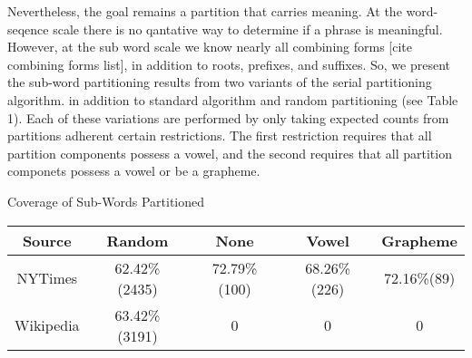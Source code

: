 Nevertheless,
the goal remains a partition that carries meaning.
At the word-seqence scale there is no qantative way to determine if a phrase is meaningful.
However, at the sub word scale we know nearly all combining forms [cite combining forms list],
in addition to roots, prefixes, and suffixes.
So, we present the sub-word partitioning results from two variants of the serial partitioning algorithm.
in addition to standard algorithm and random partitioning (see Table 1).
Each of these variations are performed by only taking expected counts from partitions adherent certain restrictions.
The first restriction requires that all partition components possess a vowel,
and the second requires that all partition componets possess a vowel or be a grapheme.

\begin{center}

{Coverage of Sub-Words Partitioned}\newline


{\fontsize{6.8}{8.16}\selectfont

\begin{tabular}{|c|c|c|c|c|}
\hline Source & Random & None  & Vowel & Grapheme\\\hline
NYTimes& 62.42\% (2435) & 72.79\% (100) &68.26\% (226) & 72.16\%(89) \\\hline
Wikipedia& 63.42\% (3191)& 0 & 0 &0 \\\hline
\end{tabular}
}
\end{center}

